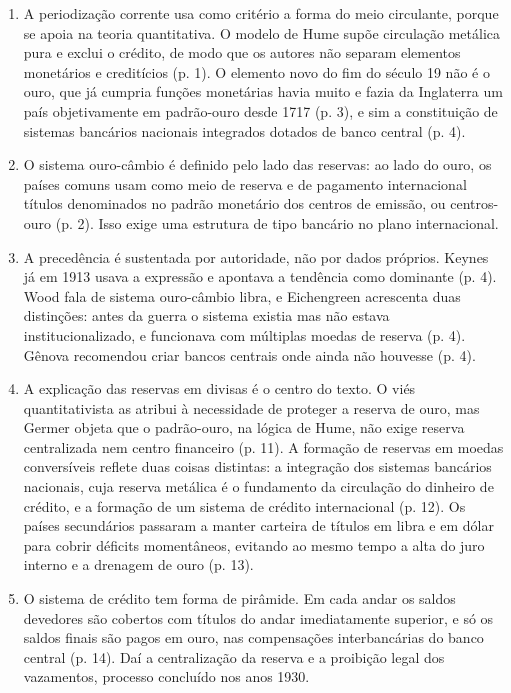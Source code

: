 \begin{enumerate}[nosep]
\item A periodização corrente usa como critério a forma do meio circulante,
porque se apoia na teoria quantitativa. O modelo de Hume supõe circulação
metálica pura e exclui o crédito, de modo que os autores não separam elementos
monetários e creditícios (p. 1). O elemento novo do fim do século 19 não é o
ouro, que já cumpria funções monetárias havia muito e fazia da Inglaterra um
país objetivamente em padrão-ouro desde 1717 (p. 3), e sim a constituição de
sistemas bancários nacionais integrados dotados de banco central (p. 4).
\item O sistema ouro-câmbio é definido pelo lado das reservas: ao lado do ouro,
os países comuns usam como meio de reserva e de pagamento internacional títulos
denominados no padrão monetário dos centros de emissão, ou centros-ouro (p. 2).
Isso exige uma estrutura de tipo bancário no plano internacional.
\item A precedência é sustentada por autoridade, não por dados próprios. Keynes
já em 1913 usava a expressão e apontava a tendência como dominante (p. 4). Wood
fala de sistema ouro-câmbio libra, e Eichengreen acrescenta duas distinções:
antes da guerra o sistema existia mas não estava institucionalizado, e
funcionava com múltiplas moedas de reserva (p. 4). Gênova recomendou criar
bancos centrais onde ainda não houvesse (p. 4).
\item A explicação das reservas em divisas é o centro do texto. O viés
quantitativista as atribui à necessidade de proteger a reserva de ouro, mas
Germer objeta que o padrão-ouro, na lógica de Hume, não exige reserva
centralizada nem centro financeiro (p. 11). A formação de reservas em moedas
conversíveis reflete duas coisas distintas: a integração dos sistemas bancários
nacionais, cuja reserva metálica é o fundamento da circulação do dinheiro de
crédito, e a formação de um sistema de crédito internacional (p. 12). Os países
secundários passaram a manter carteira de títulos em libra e em dólar para
cobrir déficits momentâneos, evitando ao mesmo tempo a alta do juro interno e a
drenagem de ouro (p. 13).
\item O sistema de crédito tem forma de pirâmide. Em cada andar os saldos
devedores são cobertos com títulos do andar imediatamente superior, e só os
saldos finais são pagos em ouro, nas compensações interbancárias do banco
central (p. 14). Daí a centralização da reserva e a proibição legal dos
vazamentos, processo concluído nos anos 1930.
\end{enumerate}

